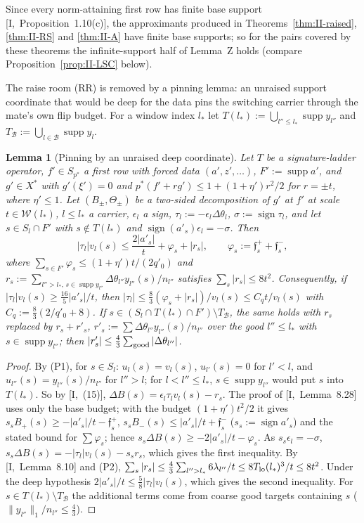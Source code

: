 \documentclass[10pt]{amsart}
\newtheorem{lemma}[theorem]{Lemma}
\theoremstyle{definition}
\theoremstyle{remark}
\newcommand{\supp}{\operatorname{supp}}
\newcommand{\sgn}{\operatorname{sign}}
\begin{document}
Since every norm-attaining first row has finite base support
[I,~Proposition~1.10(c)], the approximants produced in
Theorems~\ref{thm:II-raised}, \ref{thm:II-RS} and \ref{thm:II-A} have finite
base supports; so for the pairs covered by these theorems the infinite-support
half of Lemma~Z holds (compare Proposition~\ref{prop:II-LSC} below).

\smallskip
The raise room (RR) is removed by a pinning lemma: an unraised support
coordinate that would be deep for the data pins the switching carrier
through the mate's own flip budget.  For a window index $l_*$ let
$T(l_*):=\bigcup_{l''\le l_*}\supp y_{l''}$ and $T_{\mathcal B}:=\bigcup_{l\in
\mathcal B}\supp y_l$.

\begin{lemma}[Pinning by an unraised deep coordinate]\label{lem:II-P}
Let $T$ be a signature-ladder operator, $f'\in S_{p^*}$ a first row with
forced data $(a',z',\dots)$, $F':=\supp a'$, and $g'\in X^*$ with
$g'(\xi')=0$ and $p^*(f'+rg')\le1+(1+\eta')r^2/2$ for $r=\pm t$, where
$\eta'\le1$.  Let $(B_\pm,\Theta_\pm)$ be a two-sided decomposition of $g'$
at $f'$ at scale $t\in\mathcal W(l_*)$, $l\le l_*$ a carrier, $\epsilon_l$ a
sign, $\tau_l:=-\epsilon_l\Delta\theta_l$, $\sigma:=\sgn\tau_l$, and let
$s\in S_l\cap F'$ with $s\notin T(l_*)$ and $\sgn(a'_s)\epsilon_l=-\sigma$.
Then
\[
 |\tau_l|v_l(s)\le\frac{2|a'_s|}t+\varphi_s+|r_s|,\qquad\varphi_s:=
 \mathfrak f^+_s+\mathfrak f^-_s,
\]
where $\sum_{s\in F'}\varphi_s\le(1+\eta')t/(2q'_0)$ and $r_s:=\sum_{l''>l_*,\,
s\in\supp y_{l''}}\Delta\theta_{l''}y_{l''}(s)/n_{l''}$ satisfies
$\sum_s|r_s|\le8t^2$.  Consequently, if $|\tau_l|v_l(s)\ge\frac{16}5|a'_s|/t$,
then $|\tau_l|\le\frac83(\varphi_s+|r_s|)/v_l(s)\le C_qt/v_l(s)$ with
$C_q:=\frac83(2/q'_0+8)$.  If $s\in(S_l\cap T(l_*)\cap F')\setminus
T_{\mathcal B}$, the same holds with $r_s$ replaced by $r_s+r'_s$,
$r'_s:=\sum\Delta\theta_{l''}y_{l''}(s)/n_{l''}$ over the good $l''\le l_*$
with $s\in\supp y_{l''}$; then $|r'_s|\le\frac43\sum_{\rm good}|\Delta
\theta_{l''}|$.
\end{lemma}

\begin{proof}
By (P1), for $s\in S_l$: $u_l(s)=v_l(s)$, $u_{l'}(s)=0$ for $l'<l$, and
$u_{l''}(s)=y_{l''}(s)/n_{l''}$ for $l''>l$; for $l<l''\le l_*$,
$s\in\supp y_{l''}$ would put $s$ into $T(l_*)$.  So by [I,~(15)],
$\Delta B(s)=\epsilon_l\tau_lv_l(s)-r_s$.  The proof of [I,~Lemma~8.28] uses
only the base budget; with the budget $(1+\eta')t^2/2$ it gives
$s_sB_+(s)\ge-|a'_s|/t-\mathfrak f^+_s$, $s_sB_-(s)\le|a'_s|/t+\mathfrak f^-_s$
($s_s:=\sgn a'_s$) and the stated bound for $\sum\varphi_s$; hence
$s_s\Delta B(s)\ge-2|a'_s|/t-\varphi_s$.  As $s_s\epsilon_l=-\sigma$,
$s_s\Delta B(s)=-|\tau_l|v_l(s)-s_sr_s$, which gives the first inequality.
By [I,~Lemma~8.10] and (P2), $\sum_s|r_s|\le\frac43\sum_{l''>l_*}6
\lambda_{l''}/t\le8T_{\rm lo}(l_*)^3/t\le8t^2$.  Under the deep hypothesis
$2|a'_s|/t\le\frac58|\tau_l|v_l(s)$, which gives the second inequality.
For $s\in T(l_*)\setminus T_{\mathcal B}$ the additional terms come from coarse
good targets containing $s$ ($\|y_{l''}\|_1/n_{l''}\le\frac43$).
\end{proof}
\end{document}
